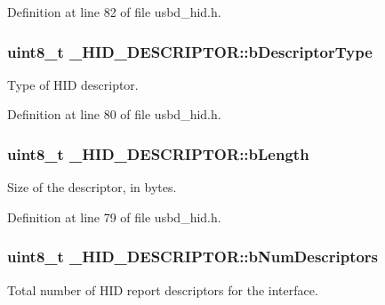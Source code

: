 Definition at line 82 of file usbd\+\_\+hid.\+h.

\subsubsection[{\texorpdfstring{b\+Descriptor\+Type}{bDescriptorType}}]{\setlength{\rightskip}{0pt plus 5cm}uint8\+\_\+t \+\_\+\+H\+I\+D\+\_\+\+D\+E\+S\+C\+R\+I\+P\+T\+O\+R\+::b\+Descriptor\+Type}\hypertarget{struct__HID__DESCRIPTOR_a212247b88d45fcb74da281192f9d4d02}{}\label{struct__HID__DESCRIPTOR_a212247b88d45fcb74da281192f9d4d02}
Type of H\+ID descriptor. 

Definition at line 80 of file usbd\+\_\+hid.\+h.

\subsubsection[{\texorpdfstring{b\+Length}{bLength}}]{\setlength{\rightskip}{0pt plus 5cm}uint8\+\_\+t \+\_\+\+H\+I\+D\+\_\+\+D\+E\+S\+C\+R\+I\+P\+T\+O\+R\+::b\+Length}\hypertarget{struct__HID__DESCRIPTOR_abec52caed8ae7c6265e6aa9fccfec729}{}\label{struct__HID__DESCRIPTOR_abec52caed8ae7c6265e6aa9fccfec729}
Size of the descriptor, in bytes. 

Definition at line 79 of file usbd\+\_\+hid.\+h.

\subsubsection[{\texorpdfstring{b\+Num\+Descriptors}{bNumDescriptors}}]{\setlength{\rightskip}{0pt plus 5cm}uint8\+\_\+t \+\_\+\+H\+I\+D\+\_\+\+D\+E\+S\+C\+R\+I\+P\+T\+O\+R\+::b\+Num\+Descriptors}\hypertarget{struct__HID__DESCRIPTOR_a9613890e6d0ae78428807a72beb64d74}{}\label{struct__HID__DESCRIPTOR_a9613890e6d0ae78428807a72beb64d74}
Total number of H\+ID report descriptors for the interface. 

